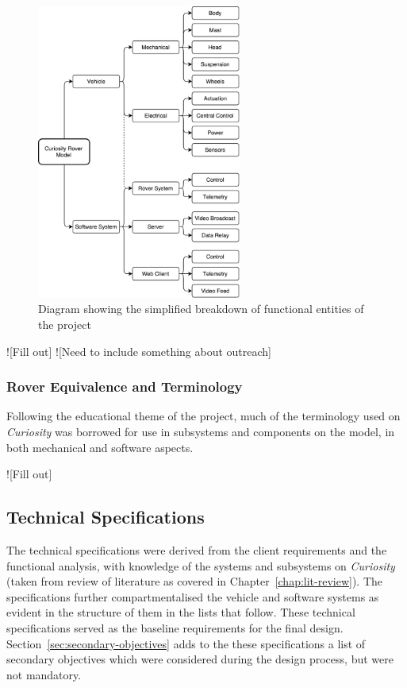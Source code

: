     \begin{figure}[h]
      \centering
      \includegraphics[width=0.6\textwidth]{figures/specs-functionalBreakdown}
      \caption[Diagram showing the simplified breakdown of functional entities of the project]{Diagram showing the simplified breakdown of functional entities of the project}
      \label{fig:specs-functionalBreakdown}
    \end{figure}
    
    ![Fill out]
    ![Need to include something about outreach]
    
    \subsubsection{Rover Equivalence and Terminology}
    \label{subsubsec:rover-equivalence}
      Following the educational theme of the project, much of the terminology used on \textit{Curiosity} was borrowed for use in subsystems and components on the model, in both mechanical and software aspects.
      
      ![Fill out]
    
    
  \subsection{Technical Specifications}
    The technical specifications were derived from the client requirements and the functional analysis, with knowledge of the systems and subsystems on \textit{Curiosity} (taken from review of literature as covered in Chapter~\ref{chap:lit-review}). The specifications further compartmentalised the vehicle and software systems as evident in the structure of them in the lists that follow. These technical specifications served as the baseline requirements for the final design. Section~\ref{sec:secondary-objectives} adds to the these specifications a list of secondary objectives which were considered during the design process, but were not mandatory.
    
